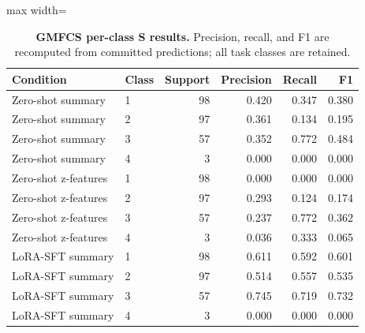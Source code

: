 \begin{table}[H]
\centering
\caption{\textbf{GMFCS per-class S results.} Precision, recall, and F1 are recomputed from committed predictions; all task classes are retained.}
\label{tab:per_class_gmfcs}
\small
\begin{adjustbox}{max width=\textwidth}
\begin{tabular}{llrrrr}
\toprule
Condition & Class & Support & Precision & Recall & F1 \\
\midrule
Zero-shot summary & 1 & 98 & 0.420 & 0.347 & 0.380 \\
Zero-shot summary & 2 & 97 & 0.361 & 0.134 & 0.195 \\
Zero-shot summary & 3 & 57 & 0.352 & 0.772 & 0.484 \\
Zero-shot summary & 4 & 3 & 0.000 & 0.000 & 0.000 \\
Zero-shot z-features & 1 & 98 & 0.000 & 0.000 & 0.000 \\
Zero-shot z-features & 2 & 97 & 0.293 & 0.124 & 0.174 \\
Zero-shot z-features & 3 & 57 & 0.237 & 0.772 & 0.362 \\
Zero-shot z-features & 4 & 3 & 0.036 & 0.333 & 0.065 \\
LoRA-SFT summary & 1 & 98 & 0.611 & 0.592 & 0.601 \\
LoRA-SFT summary & 2 & 97 & 0.514 & 0.557 & 0.535 \\
LoRA-SFT summary & 3 & 57 & 0.745 & 0.719 & 0.732 \\
LoRA-SFT summary & 4 & 3 & 0.000 & 0.000 & 0.000 \\
\bottomrule
\end{tabular}
\end{adjustbox}
\end{table}
